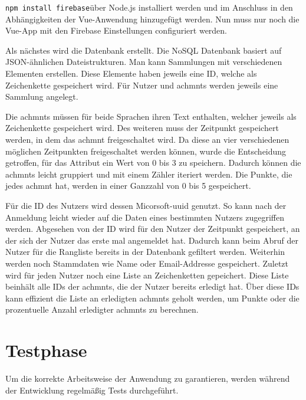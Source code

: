 \documentclass[11pt]{article}
\begin{document}
\texttt{npm install firebase}\newline über Node.js installiert werden und im Anschluss in den
Abhängigkeiten der Vue-Anwendung hinzugefügt werden.
Nun muss nur noch die Vue-App mit den Firebase Einstellungen configuriert werden.

Als nächstes wird die Datenbank erstellt. Die \gls{NoSQL} Datenbank basiert auf JSON-ähnlichen
Dateistrukturen. Man kann Sammlungen mit verschiedenen Elementen erstellen. Diese Elemente haben jeweils eine ID, welche
als Zeichenkette gespeichert wird. Für Nutzer und \glspl{achmnt} werden jeweils eine Sammlung angelegt. 

Die \glspl{achmnt} müssen für beide Sprachen ihren Text enthalten, welcher jeweils als Zeichenkette gespeichert wird.
Des weiteren muss der Zeitpunkt gespeichert werden, in dem das \gls{achmnt} freigeschaltet wird. Da diese an vier verschiedenen
möglichen Zeitpunkten freigeschaltet werden können, wurde die Entscheidung getroffen, für das Attribut ein Wert von 0 bis 3 zu speichern.
Dadurch können die \glspl{achmnt} leicht gruppiert und mit einem Zähler iteriert werden.
Die Punkte, die jedes \gls{achmnt} hat, werden in einer Ganzzahl von 0 bis 5 gespeichert.

Für die ID des Nutzers wird dessen Micorsoft-\gls{uuid} genutzt. So kann nach der Anmeldung leicht wieder auf die
Daten eines bestimmten Nutzers zugegriffen werden. Abgesehen von der ID wird für den Nutzer der Zeitpunkt gespeichert, an der sich der Nutzer das erste mal
angemeldet hat. Dadurch kann beim Abruf der Nutzer für die Rangliste bereits in der Datenbank gefiltert werden.
Weiterhin werden noch Stammdaten wie Name oder Email-Addresse gespeichert.
Zuletzt wird für jeden Nutzer noch eine Liste an Zeichenketten gepeichert. Diese Liste beinhält alle IDs der \glspl{achmnt}, die der
Nutzer bereits erledigt hat. Über diese IDs kann effizient die Liste an erledigten \glspl{achmnt} geholt werden, um Punkte oder
die prozentuelle Anzahl erledigter \glspl{achmnt} zu berechnen.


%
%

\section{Testphase}

Um die korrekte Arbeitsweise der Anwendung zu garantieren, werden während der Entwicklung regelmäßig Tests durchgeführt.
\end{document}
